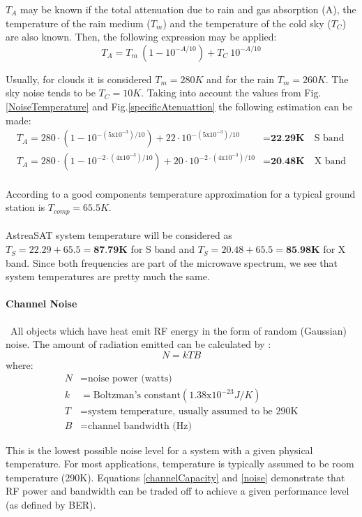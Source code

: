 $T_A$ may be known if the total attenuation due to rain and gas absorption (A), the
temperature of the rain medium ($T_m$) and the temperature of the cold sky ($T_C$) are also
known. Then, the following expression may be applied:
\begin{equation}
	T_A=T_m\ (1-10^{-A/10})+T_C\ 10^{-A/10}
\end{equation}

Usually, for clouds it is considered $T_m=280K$ and for the rain $T_m=260K$. The sky noise tends to be $T_C=10K$. Taking into account the values from Fig.\ref{NoiseTemperature} and Fig.\ref{specificAtenuattion} the following estimation can be made:
\begin{align*}
	T_A=280\cdot (1-10^{-(5\mathrm{x}10^{-3})/10})+22\cdot 10^{-(5\mathrm{x}10^{-3})/10}&=\textbf{22.29K} \quad \text{S band} \\
	T_A=280\cdot (1-10^{-2\cdot(4\mathrm{x}10^{-3})/10})+20\cdot 10^{-2\cdot(4\mathrm{x}10^{-3})/10}&=\textbf{20.48K} \quad \text{X band} 
\end{align*}

\paragraph{} According to \cite{Jorge2012} a good components temperature approximation for a typical ground station is $T_{comp}=65.5K$.

\paragraph{} AstreaSAT system temperature will be considered as $T_S=22.29+65.5=\textbf{87.79K}$ for S band and $T_S=20.48+65.5=\textbf{85.98K}$ for X band. Since both frequencies are part of the microwave spectrum, we see that system temperatures are pretty much the same.

\paragraph{Channel Noise}\
All objects which have heat emit RF energy in the form of random (Gaussian) noise. The amount of radiation emitted can be calculated by \cite{Note1998}:
\begin{equation}
N=kTB
\label{noise}
\end{equation}
where:
\begin{align*}
	N&= \text{noise power (watts)}\\
	k&= \text{Boltzman's constant}(1.38\mathrm{x}10^{-23}J/K)\\
	T&= \text{system temperature, usually assumed to be 290K}\\
	B&= \text{channel bandwidth (Hz)}
\end{align*}

This is the lowest possible noise level for a system with a given physical temperature. For most applications, temperature is typically assumed to be room temperature (290K). Equations \ref{channelCapacity} and \ref{noise} demonstrate that RF power and bandwidth can be traded off to achieve a given performance level (as defined by BER). \cite{Note1998}
